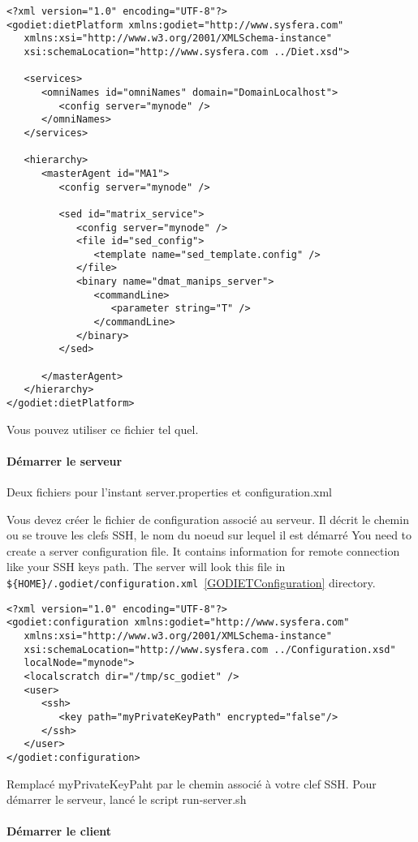 \begin{verbatim}
<?xml version="1.0" encoding="UTF-8"?>
<godiet:dietPlatform xmlns:godiet="http://www.sysfera.com"
   xmlns:xsi="http://www.w3.org/2001/XMLSchema-instance"
   xsi:schemaLocation="http://www.sysfera.com ../Diet.xsd">

   <services>
      <omniNames id="omniNames" domain="DomainLocalhost">
         <config server="mynode" />
      </omniNames>
   </services>

   <hierarchy>
      <masterAgent id="MA1">
         <config server="mynode" />

         <sed id="matrix_service">
            <config server="mynode" />
            <file id="sed_config">
               <template name="sed_template.config" />
            </file>
            <binary name="dmat_manips_server">
               <commandLine>
                  <parameter string="T" />
               </commandLine>
            </binary>
         </sed>
      
      </masterAgent>
   </hierarchy>
</godiet:dietPlatform>
\end{verbatim}

Vous pouvez utiliser ce fichier tel quel.

\paragraph{Démarrer le serveur}

Deux fichiers pour l'instant server.properties et configuration.xml

Vous devez créer le fichier de configuration associé au serveur. Il décrit le chemin ou se trouve les clefs SSH, le nom du noeud sur lequel il est démarré
You need to create a \godiet server configuration file. It contains information for remote connection like your SSH keys path. The server will look this file 
in \verb+${HOME}/.godiet/configuration.xml+~\ref{GODIETConfiguration} directory.


\begin{verbatim}
<?xml version="1.0" encoding="UTF-8"?>
<godiet:configuration xmlns:godiet="http://www.sysfera.com"
   xmlns:xsi="http://www.w3.org/2001/XMLSchema-instance"
   xsi:schemaLocation="http://www.sysfera.com ../Configuration.xsd"
   localNode="mynode">
   <localscratch dir="/tmp/sc_godiet" />
   <user>
      <ssh>
         <key path="myPrivateKeyPath" encrypted="false"/>
      </ssh>
   </user>
</godiet:configuration>
\end{verbatim}

Remplacé myPrivateKeyPaht par le chemin associé à votre clef SSH.
Pour démarrer le serveur, lancé le script run-server.sh

\paragraph{Démarrer le client}





